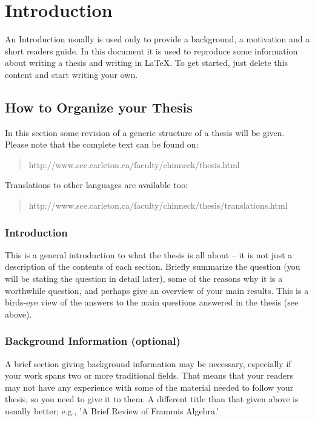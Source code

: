 \chapter{Introduction}\label{introduction}



An Introduction usually is used only to provide a background, a motivation and a short readers guide. In this document it is used to reproduce some information about writing a thesis and writing in \LaTeX. To get started, just delete this content and start writing your own.

\section{How to Organize your Thesis}
In this section some revision of a generic structure of a thesis will be given. Please note that the complete text can be found on:
\begin{quote}
	http://www.sce.carleton.ca/faculty/chinneck/thesis.html
\end{quote}
Translations to other languages are available too:
\begin{quote}
	http://www.sce.carleton.ca/faculty/chinneck/thesis/translations.html
\end{quote}


\subsection{Introduction}

This is a general introduction to what the thesis is all about -- it is not just a description of the contents of each section. Briefly summarize the question (you will be stating the question in detail later), some of the reasons why it is a worthwhile question, and perhaps give an overview of your main results. This is a birds-eye view of the answers to the main questions answered in the thesis (see above).

\subsection{Background Information (optional)}

A brief section giving background information may be necessary, especially if your work spans two or more traditional fields. That means that your readers may not have any experience with some of the material needed to follow your thesis, so you need to give it to them. A different title than that given above is usually better; e.g., 'A Brief Review of Frammis Algebra.'

